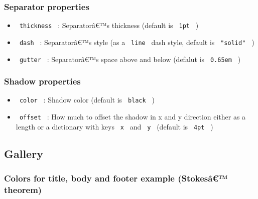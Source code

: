 \subsubsection{Separator properties}\label{separator-properties}

\begin{itemize}
\tightlist
\item
  \texttt{\ thickness\ } : Separatorâ€™s thickness (default is
  \texttt{\ 1pt\ } )
\item
  \texttt{\ dash\ } : Separatorâ€™s style (as a \texttt{\ line\ } dash
  style, default is \texttt{\ "solid"\ } )
\item
  \texttt{\ gutter\ } : Separatorâ€™s space above and below (defalut is
  \texttt{\ 0.65em\ } )
\end{itemize}

\subsubsection{Shadow properties}\label{shadow-properties}

\begin{itemize}
\tightlist
\item
  \texttt{\ color\ } : Shadow color (default is \texttt{\ black\ } )
\item
  \texttt{\ offset\ } : How much to offset the shadow in x and y
  direction either as a length or a dictionary with keys \texttt{\ x\ }
  and \texttt{\ y\ } (default is \texttt{\ 4pt\ } )
\end{itemize}

\subsection{Gallery}\label{gallery}

\subsubsection{Colors for title, body and footer example (Stokesâ€™
theorem)}\label{colors-for-title-body-and-footer-example-stokesuxe2-theorem}

\subsubsection{\texorpdfstring{\protect{}}{Encapsulation}}\label{encapsulation}

